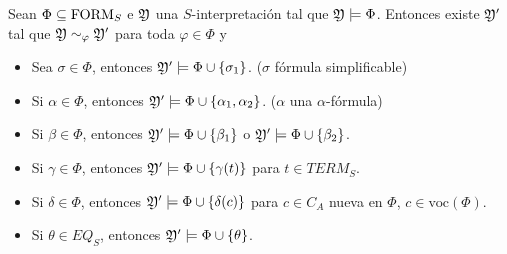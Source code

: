 \begin{prop}
Sean $\Phi \subseteq \mbox{FORM}_{S}$ e $\mathfrak{Y}$ una $S$-interpretación tal que $\mathfrak{Y} \models \Phi$. Entonces existe $\mathfrak{Y}'$ tal que $\mathfrak{Y} \sim_{\varphi} \mathfrak{Y}'$ para toda $\varphi \in \Phi$ y
\begin{itemize}
    \item Sea $\sigma \in \Phi$, entonces $\mathfrak{Y}' \models \Phi \cup \{\sigma_1 \}$. ($\sigma$ fórmula simplificable)
    \item Si $\alpha \in \Phi$, entonces $\mathfrak{Y}' \models \Phi \cup \{\alpha_1, \alpha_2 \}$. ($\alpha$ una $\alpha$-fórmula)
    \item Si $\beta \in \Phi$, entonces $\mathfrak{Y}' \models \Phi \cup \{\beta_1\}$ o $\mathfrak{Y}' \models \Phi \cup \{\beta_2\}$.   
    \item Si $\gamma \in \Phi$, entonces $\mathfrak{Y}' \models \Phi \cup \{\gamma(t)\}$ para $t \in TERM_S$.
    \item Si $\delta \in \Phi$, entonces $\mathfrak{Y}' \models \Phi \cup \{\delta(c)\}$ para $c \in C_A$ nueva en $\Phi$, $c \in \mbox{voc}(\Phi)$.
    \item Si $\theta \in EQ_S$, entonces $\mathfrak{Y}' \models \Phi \cup \{ \theta\}$.
\end{itemize}
\end{prop}
